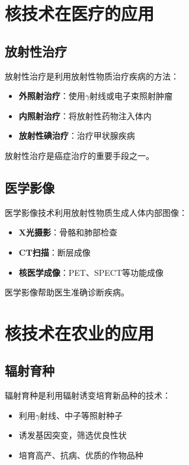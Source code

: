 \documentclass[12pt,UTF8]{ctexbook}
\begin{document}
\chapter{核技术在医疗的应用}

\section{放射性治疗}

放射性治疗是利用放射性物质治疗疾病的方法：

\begin{itemize}[leftmargin=2cm]
    \item \textbf{外照射治疗}：使用$\gamma$射线或电子束照射肿瘤
    \item \textbf{内照射治疗}：将放射性药物注入体内
    \item \textbf{放射性碘治疗}：治疗甲状腺疾病
\end{itemize}

放射性治疗是癌症治疗的重要手段之一。

\section{医学影像}

医学影像技术利用放射性物质生成人体内部图像：

\begin{itemize}[leftmargin=2cm]
    \item \textbf{X光摄影}：骨骼和肺部检查
    \item \textbf{CT扫描}：断层成像
    \item \textbf{核医学成像}：PET、SPECT等功能成像
\end{itemize}

医学影像帮助医生准确诊断疾病。

\chapter{核技术在农业的应用}

\section{辐射育种}

辐射育种是利用辐射诱变培育新品种的技术：

\begin{itemize}[leftmargin=2cm]
    \item 利用$\gamma$射线、中子等照射种子
    \item 诱发基因突变，筛选优良性状
    \item 培育高产、抗病、优质的作物品种
\end{itemize}
\end{document}
